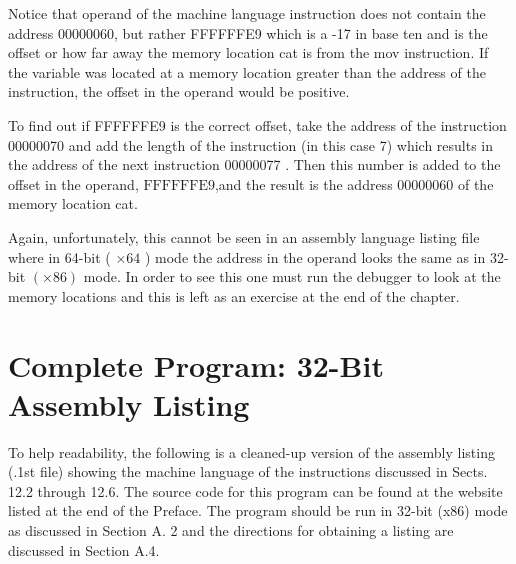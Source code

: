 \documentclass[10pt]{book}
\begin{document}
Notice that operand of the machine language instruction does not contain the address 00000060, but rather FFFFFFE9 which is a -17 in base ten and is the offset or how far away the memory location cat is from the mov instruction. If the variable was located at a memory location greater than the address of the instruction, the offset in the operand would be positive.

To find out if FFFFFFE9 is the correct offset, take the address of the instruction 00000070 and add the length of the instruction (in this case 7) which results in the address of the next instruction 00000077 . Then this number is added to the offset in the operand, $\mathrm{FFFFFFE9}$,and the result is the address 00000060 of the memory location cat.

Again, unfortunately, this cannot be seen in an assembly language listing file where in 64-bit ( $\times 64$ ) mode the address in the operand looks the same as in 32-bit $(\times 86)$ mode. In order to see this one must run the debugger to look at the memory locations and this is left as an exercise at the end of the chapter.

\section{Complete Program: 32-Bit Assembly Listing}
To help readability, the following is a cleaned-up version of the assembly listing (.1st file) showing the machine language of the instructions discussed in Sects. 12.2 through 12.6. The source code for this program can be found at the website listed at the end of the Preface. The program should be run in 32-bit (x86) mode as discussed in Section A. 2 and the directions for obtaining a listing are discussed in Section A.4.
\end{document}
